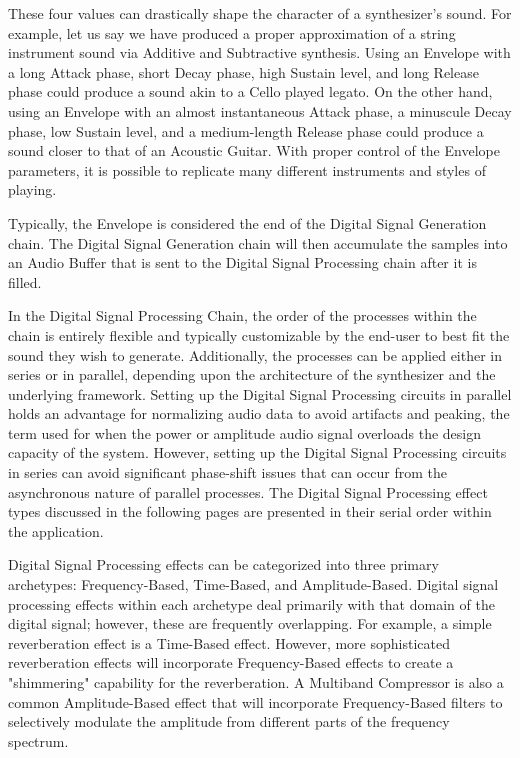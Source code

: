 \documentclass[a4paper,12pt]{report}
\begin{document}
These four values can drastically shape the character of a synthesizer's sound. For example, let us say we have produced a proper approximation of a string instrument sound via Additive and Subtractive synthesis. Using an Envelope with a long Attack phase, short Decay phase, high Sustain level, and long Release phase could produce a sound akin to a Cello played legato. On the other hand, using an Envelope with an almost instantaneous Attack phase, a minuscule Decay phase, low Sustain level, and a medium-length Release phase could produce a sound closer to that of an Acoustic Guitar. With proper control of the Envelope parameters, it is possible to replicate many different instruments and styles of playing.

Typically, the Envelope is considered the end of the Digital Signal Generation chain. The Digital Signal Generation chain will then accumulate the samples into an Audio Buffer that is sent to the Digital Signal Processing chain after it is filled.

In the Digital Signal Processing Chain, the order of the processes within the chain is entirely flexible and typically customizable by the end-user to best fit the sound they wish to generate. Additionally, the processes can be applied either in series or in parallel, depending upon the architecture of the synthesizer and the underlying framework. Setting up the Digital Signal Processing circuits in parallel holds an advantage for normalizing audio data to avoid artifacts and peaking, the term used for when the power or amplitude audio signal overloads the design capacity of the system. However, setting up the Digital Signal Processing circuits in series can avoid significant phase-shift issues that can occur from the asynchronous nature of parallel processes. The Digital Signal Processing effect types discussed in the following pages are presented in their serial order within the application.

Digital Signal Processing effects can be categorized into three primary archetypes: Frequency-Based, Time-Based, and Amplitude-Based. Digital signal processing effects within each archetype deal primarily with that domain of the digital signal; however, these are frequently overlapping. For example, a simple reverberation effect is a Time-Based effect. However, more sophisticated reverberation effects will incorporate Frequency-Based effects to create a "shimmering" capability for the reverberation. A Multiband Compressor is also a common Amplitude-Based effect that will incorporate Frequency-Based filters to selectively modulate the amplitude from different parts of the frequency spectrum.
\end{document}
